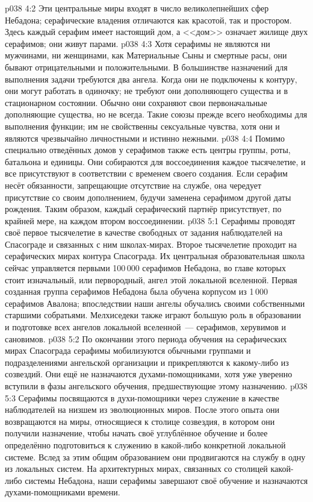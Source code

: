 \vs p038 4:2 Эти центральные миры входят в число великолепнейших сфер Небадона; серафические владения отличаются как красотой, так и простором. Здесь каждый серафим имеет настоящий дом, а <<дом>> означает жилище двух серафимов; они живут парами.
\vs p038 4:3 \pc Хотя серафимы не являются ни мужчинами, ни женщинами, как Материальные Сыны и смертные расы, они бывают отрицательными и положительными. В большинстве назначений для выполнения задачи требуются два ангела. Когда они не подключены к контуру, они могут работать в одиночку; не требуют они дополняющего существа и в стационарном состоянии. Обычно они сохраняют свои первоначальные дополняющие существа, но не всегда. Такие союзы прежде всего необходимы для выполнения функции; им не свойственны сексуальные чувства, хотя они и являются чрезвычайно личностными и истинно нежными.
\vs p038 4:4 Помимо специально отведённых домов у серафимов также есть центры группы, роты, батальона и единицы. Они собираются для воссоединения каждое тысячелетие, и все присутствуют в соответствии с временем своего создания. Если серафим несёт обязанности, запрещающие отсутствие на службе, она чередует присутствие со своим дополнением, будучи заменена серафимом другой даты рождения. Таким образом, каждый серафический партнёр присутствует, по крайней мере, на каждом втором воссоединении.
\vs p038 5:1 Серафимы проводят своё первое тысячелетие в качестве свободных от задания наблюдателей на Спасограде и связанных с ним школах\hyp{}мирах. Второе тысячелетие проходит на серафических мирах контура Спасограда. Их центральная образовательная школа сейчас управляется первыми 100\,000 серафимов Небадона, во главе которых стоит изначальный, или первородный, ангел этой локальной вселенной. Первая созданная группа серафимов Небадона была обучена корпусом из 1\,000 серафимов Авалона; впоследствии наши ангелы обучались своими собственными старшими собратьями. Мелхиседеки также играют большую роль в образовании и подготовке всех ангелов локальной вселенной~--- серафимов, херувимов и сановимов.
\vs p038 5:2 По окончании этого периода обучения на серафических мирах Спасограда серафимы мобилизуются обычными группами и подразделениями ангельской организации и прикрепляются к какому\hyp{}либо из созвездий. Они ещё не назначаются духами\hyp{}помощниками, хотя уже уверенно вступили в фазы ангельского обучения, предшествующие этому назначению.
\vs p038 5:3 Серафимы посвящаются в духи\hyp{}помощники через служение в качестве наблюдателей на низшем из эволюционных миров. После этого опыта они возвращаются на миры, относящиеся к столице созвездия, в котором они получили назначение, чтобы начать своё углублённое обучение и более определённо подготовиться к служению в какой\hyp{}либо конкретной локальной системе. Вслед за этим общим образованием они продвигаются на службу в одну из локальных систем. На архитектурных мирах, связанных со столицей какой\hyp{}либо системы Небадона, наши серафимы завершают своё обучение и назначаются духами\hyp{}помощниками времени.
